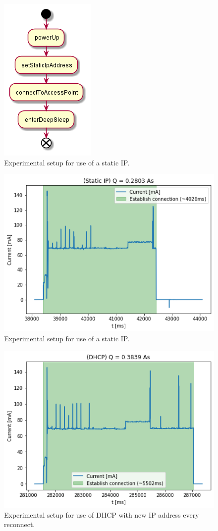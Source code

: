 \begin{figure}[h]
    \centering
    \includegraphics[width = 0.35 \linewidth]{fig/sequence_static_ip.png}
    \caption{Experimental setup for use of a static IP.}
    \label{fig:experiment_static_ip}
\end{figure}
\begin{figure}[h]
    \centering
    \includegraphics[width =\linewidth]{fig/static_ip.png}
    \caption{Experimental setup for use of a static IP.}
    \label{fig:static_ip}
\end{figure}
\begin{figure}[h] 
    \centering
    \includegraphics[width =\linewidth]{fig/dhcp.png}
    \caption{Experimental setup for use of DHCP with new IP address every reconnect.}
    \label{fig:dhcp}
\end{figure}
\pagebreak